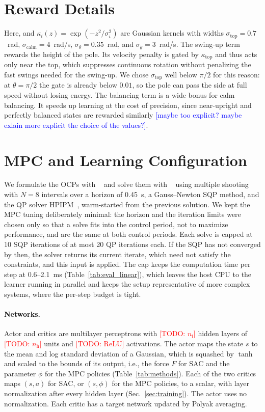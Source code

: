 \documentclass{l4dc2027}
\let\cite\citep
\newcommand{\todo}[1]{\textcolor{red}{[TODO: #1]}}
\newcommand{\note}[1]{\textcolor{blue}{[#1]}}
\begin{document}
\section{Reward Details}
\label{app:reward}
Here, and $\kappa_i(z)=\exp(-z^2/\sigma_i^2)$ are Gaussian kernels with widths
$\sigma_{\mathrm{top}}=0.7$~rad, $\sigma_{\mathrm{calm}}=4$~rad/s,
$\sigma_\theta=0.35$~rad, and $\sigma_{\dot\theta}=3$~rad/s. The swing-up term
rewards the height of the pole. Its velocity penalty is gated by
$\kappa_{\mathrm{top}}$ and thus acts only near the top, which suppresses
continuous rotation without penalizing the fast swings needed for the swing-up.
We chose $\sigma_{\mathrm{top}}$ well below $\pi/2$ for this reason: at
$\theta=\pi/2$ the gate is already below $0.01$, so the pole can pass the side
at full speed without losing energy. The balancing term is a wide bonus for calm
balancing. It speeds up learning at the cost of precision, since near-upright
and perfectly balanced states are rewarded similarly \note{maybe too explicit? maybe exlain more explicit the choice of the values?}.

\section{MPC and Learning Configuration}
\label{app:config}
We formulate the OCPs with \leapc~\cite{leapc} and solve them with
\acados~\cite{verschueren2021acados} using multiple shooting with $N=8$
intervals over a horizon of 0.45~s, a Gauss--Newton SQP method, and the QP
solver HPIPM~\cite{frison2020hpipm}, warm-started from the previous solution.
We kept the MPC tuning deliberately minimal: the horizon and the iteration
limits were chosen only so that a solve fits into the control period, not to
maximize performance, and are the same at both control periods. Each solve is
capped at 10 SQP iterations of at most 20 QP iterations each. If the SQP has
not converged by then, the solver returns its current iterate, which need not
satisfy the constraints, and this input is applied. The cap keeps the
computation time per step at 0.6--2.1~ms (Table~\ref{tab:eval_linear}), which
leaves the host CPU to the learner running in parallel and keeps the setup
representative of more complex systems, where the per-step budget is tight.

{\color{magenta}\paragraph{Networks.} Actor and critics are multilayer perceptrons with
\todo{$n_\mathrm{l}$} hidden layers of \todo{$n_\mathrm{h}$} units and
\todo{ReLU} activations. The actor maps the state $s$ to the mean and log
standard deviation of a Gaussian, which is squashed by $\tanh$ and scaled to
the bounds of its output, i.e., the force $F$ for \ac{SAC} and the parameter
$\phi$ for the \ac{MPC} policies (Table~\ref{tab:methods}). Each of the two
critics maps $(s,a)$ for \ac{SAC}, or $(s,\phi)$ for the \ac{MPC} policies, to a
scalar, with layer normalization after every hidden layer
(Sec.~\ref{sec:training}). The actor uses no normalization. Each critic has a
target network updated by Polyak averaging.}
\end{document}

